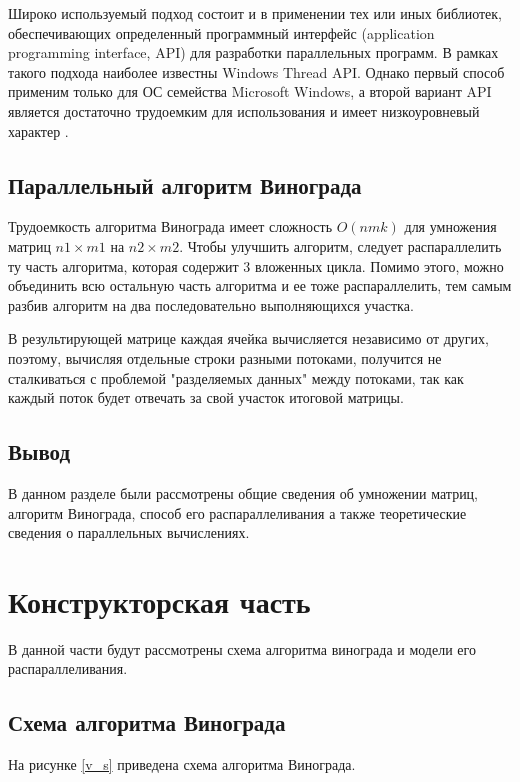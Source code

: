 \documentclass[a4paper, 14pt]{article}
\begin{document}
	Широко используемый подход состоит и в применении тех или иных библиотек, обеспечивающих определенный программный интерфейс (application programming interface, API) для разработки параллельных программ. В рамках такого подхода наиболее известны Windows Thread API. Однако первый способ применим только для ОС семейства Microsoft Windows, а второй вариант API является достаточно трудоемким для использования и имеет низкоуровневый характер \cite{Barkalov}.
	\subsection{Параллельный алгоритм Винограда}
	Трудоемкость алгоритма Винограда имеет сложность $O(nmk)$ для умножения матриц $n1 \times m1$ на $n2 \times m2$. Чтобы улучшить алгоритм, следует распараллелить ту часть алгоритма, которая содержит 3 вложенных цикла. Помимо этого, можно объединить всю остальную часть алгоритма и ее тоже распараллелить, тем самым разбив алгоритм на два последовательно выполняющихся участка.
	
	В результирующей матрице каждая ячейка вычисляется независимо от других, поэтому, вычисляя отдельные строки разными потоками, получится не сталкиваться с проблемой "разделяемых данных" между потоками, так как каждый поток будет отвечать за свой участок итоговой матрицы.
	
	   
    \subsection{Вывод}
    В данном разделе были рассмотрены общие сведения об умножении матриц, алгоритм Винограда, способ его распараллеливания а также теоретические сведения о параллельных вычислениях.
     	\newpage
        \section{Конструкторская часть}
        
		В данной части будут рассмотрены схема алгоритма винограда и модели его распараллеливания. \\
        \subsection{Схема алгоритма Винограда}
        На рисунке \ref{v_s} приведена схема алгоритма Винограда.\\


        \newpage   
\end{document}
